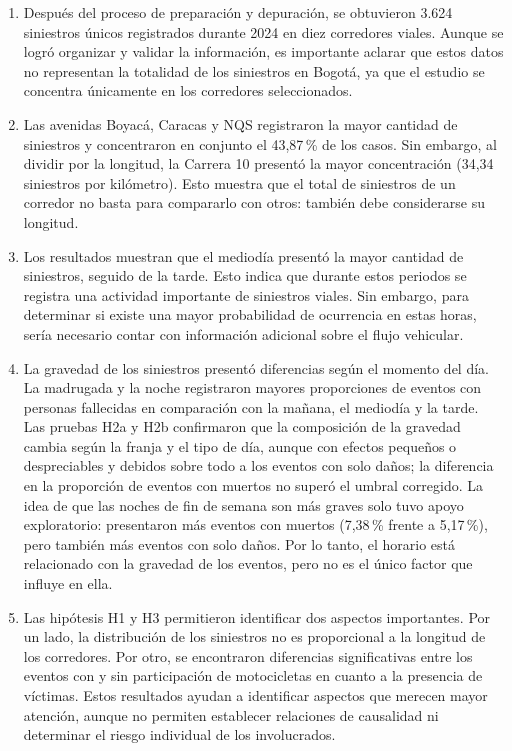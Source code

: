 \documentclass[12pt,letterpaper]{article}
\begin{document}
\begin{enumerate}[leftmargin=*,itemsep=6pt]
\item Después del proceso de preparación y depuración, se obtuvieron 3.624 siniestros únicos registrados durante 2024 en diez corredores viales. Aunque se logró organizar y validar la información, es importante aclarar que estos datos no representan la totalidad de los siniestros en Bogotá, ya que el estudio se concentra únicamente en los corredores seleccionados.

\item Las avenidas Boyacá, Caracas y NQS registraron la mayor cantidad de siniestros y concentraron en conjunto el 43,87\,\% de los casos. Sin embargo, al dividir por la longitud, la Carrera 10 presentó la mayor concentración (34,34 siniestros por kilómetro). Esto muestra que el total de siniestros de un corredor no basta para compararlo con otros: también debe considerarse su longitud.

\item Los resultados muestran que el mediodía presentó la mayor cantidad de siniestros, seguido de la tarde. Esto indica que durante estos periodos se registra una actividad importante de siniestros viales. Sin embargo, para determinar si existe una mayor probabilidad de ocurrencia en estas horas, sería necesario contar con información adicional sobre el flujo vehicular.

\item La gravedad de los siniestros presentó diferencias según el momento del día. La madrugada y la noche registraron mayores proporciones de eventos con personas fallecidas en comparación con la mañana, el mediodía y la tarde. Las pruebas H2a y H2b confirmaron que la composición de la gravedad cambia según la franja y el tipo de día, aunque con efectos pequeños o despreciables y debidos sobre todo a los eventos con solo daños; la diferencia en la proporción de eventos con muertos no superó el umbral corregido. La idea de que las noches de fin de semana son más graves solo tuvo apoyo exploratorio: presentaron más eventos con muertos (7,38\,\% frente a 5,17\,\%), pero también más eventos con solo daños. Por lo tanto, el horario está relacionado con la gravedad de los eventos, pero no es el único factor que influye en ella.

\item Las hipótesis H1 y H3 permitieron identificar dos aspectos importantes. Por un lado, la distribución de los siniestros no es proporcional a la longitud de los corredores. Por otro, se encontraron diferencias significativas entre los eventos con y sin participación de motocicletas en cuanto a la presencia de víctimas. Estos resultados ayudan a identificar aspectos que merecen mayor atención, aunque no permiten establecer relaciones de causalidad ni determinar el riesgo individual de los involucrados.


\end{enumerate}
\end{document}
